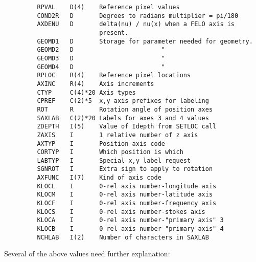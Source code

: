 \begin{verbatim}
         RPVAL    D(4)    Reference pixel values
         COND2R   D       Degrees to radians multiplier = pi/180
         AXDENU   D       delta(nu) / nu(x) when a FELO axis is
                          present.
         GEOMD1   D       Storage for parameter needed for geometry.
         GEOMD2   D                        "
         GEOMD3   D                        "
         GEOMD4   D                        "
         RPLOC    R(4)    Reference pixel locations
         AXINC    R(4)    Axis increments
         CTYP     C(4)*20 Axis types
         CPREF    C(2)*5  x,y axis prefixes for labeling
         ROT      R       Rotation angle of position axes
         SAXLAB   C(2)*20 Labels for axes 3 and 4 values
         ZDEPTH   I(5)    Value of Idepth from SETLOC call
         ZAXIS    I       1 relative number of z axis
         AXTYP    I       Position axis code
         CORTYP   I       Which position is which
         LABTYP   I       Special x,y label request
         SGNROT   I       Extra sign to apply to rotation
         AXFUNC   I(7)    Kind of axis code
         KLOCL    I       0-rel axis number-longitude axis
         KLOCM    I       0-rel axis number-latitude axis
         KLOCF    I       0-rel axis number-frequency axis
         KLOCS    I       0-rel axis number-stokes axis
         KLOCA    I       0-rel axis number-"primary axis" 3
         KLOCB    I       0-rel axis number-"primary axis" 4
         NCHLAB   I(2)    Number of characters in SAXLAB

\end{verbatim}
Several of the above values need further explanation:

